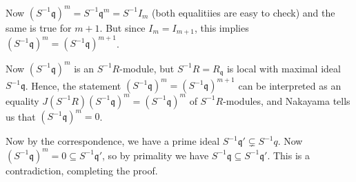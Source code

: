Now $(S^{-1}\mathfrak{q})^m = S^{-1}\mathfrak{q}^m = S^{-1}I_m$ (both equalitiies
are easy to check) and the same is true for $m + 1$. But since $I_m = I_{m+1}$,
this implies $(S^{-1}\mathfrak{q})^m = (S^{-1}\mathfrak{q})^{m+1}$.

Now
$(S^{-1}\mathfrak{q})^m$ is an $S^{-1}R$-module, but $S^{-1}R = R_{\mathfrak{q}}$
is local with maximal ideal $S^{-1}\mathfrak{q}$. Hence, the statement
$(S^{-1}\mathfrak{q})^m = (S^{-1}\mathfrak{q})^{m+1}$ can be interpreted as an
equality $J(S^{-1}R)(S^{-1}\mathfrak{q})^m = (S^{-1}\mathfrak{q})^m$ of
$S^{-1}R$-modules, and Nakayama tells us that $(S^{-1}\mathfrak{q})^m = 0$.

Now by the correspondence, we have a prime ideal $S^{-1}\mathfrak{q}' \subsetneq S^{-1}q$.
Now $(S^{-1}\mathfrak{q})^m = 0 \subseteq S^{-1}\mathfrak{q}'$, so by primality
we have $S^{-1}\mathfrak{q} \subseteq S^{-1}\mathfrak{q}'$. This is a contradiction,
completing the proof.
